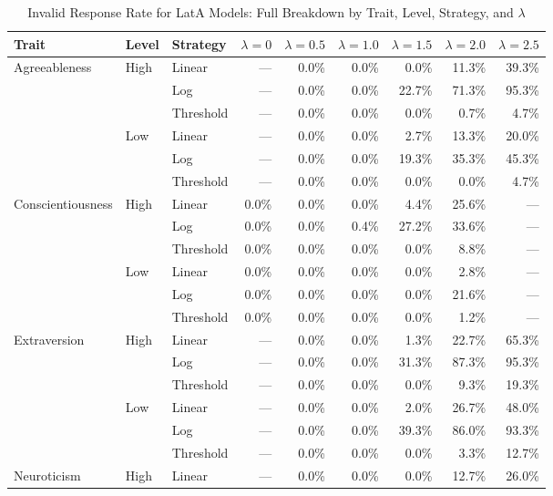 \begin{table}[htbp]
\begin{threeparttable}
\caption{Invalid Response Rate for LatA Models: Full Breakdown by Trait, Level, Strategy, and $\lambda$}
\label{tab:lata_full_validity}
\centering
\scriptsize
\setlength{\tabcolsep}{3pt}
\begin{tabular}{lllrrrrrr}
\toprule
Trait & Level & Strategy & $\lambda=0$ & $\lambda=0.5$ & $\lambda=1.0$ & $\lambda=1.5$ & $\lambda=2.0$ & $\lambda=2.5$ \\
\midrule
  Agreeableness & High & Linear & — & 0.0\% & 0.0\% & 0.0\% & 11.3\% & 39.3\% \\
   &  & Log & — & 0.0\% & 0.0\% & 22.7\% & 71.3\% & 95.3\% \\
   &  & Threshold & — & 0.0\% & 0.0\% & 0.0\% & 0.7\% & 4.7\% \\
   & Low & Linear & — & 0.0\% & 0.0\% & 2.7\% & 13.3\% & 20.0\% \\
   &  & Log & — & 0.0\% & 0.0\% & 19.3\% & 35.3\% & 45.3\% \\
   &  & Threshold & — & 0.0\% & 0.0\% & 0.0\% & 0.0\% & 4.7\% \\
\addlinespace
  Conscientiousness & High & Linear & 0.0\% & 0.0\% & 0.0\% & 4.4\% & 25.6\% & — \\
   &  & Log & 0.0\% & 0.0\% & 0.4\% & 27.2\% & 33.6\% & — \\
   &  & Threshold & 0.0\% & 0.0\% & 0.0\% & 0.0\% & 8.8\% & — \\
   & Low & Linear & 0.0\% & 0.0\% & 0.0\% & 0.0\% & 2.8\% & — \\
   &  & Log & 0.0\% & 0.0\% & 0.0\% & 0.0\% & 21.6\% & — \\
   &  & Threshold & 0.0\% & 0.0\% & 0.0\% & 0.0\% & 1.2\% & — \\
\addlinespace
  Extraversion & High & Linear & — & 0.0\% & 0.0\% & 1.3\% & 22.7\% & 65.3\% \\
   &  & Log & — & 0.0\% & 0.0\% & 31.3\% & 87.3\% & 95.3\% \\
   &  & Threshold & — & 0.0\% & 0.0\% & 0.0\% & 9.3\% & 19.3\% \\
   & Low & Linear & — & 0.0\% & 0.0\% & 2.0\% & 26.7\% & 48.0\% \\
   &  & Log & — & 0.0\% & 0.0\% & 39.3\% & 86.0\% & 93.3\% \\
   &  & Threshold & — & 0.0\% & 0.0\% & 0.0\% & 3.3\% & 12.7\% \\
\addlinespace
  Neuroticism & High & Linear & — & 0.0\% & 0.0\% & 0.0\% & 12.7\% & 26.0\% \\

\end{tabular}
\end{threeparttable}
\end{table}
